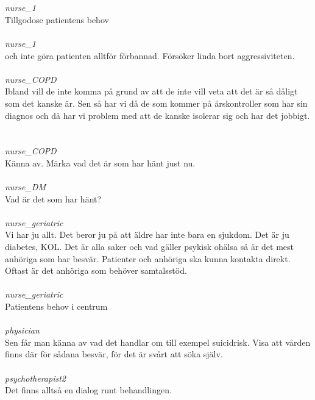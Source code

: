 \documentclass[12pt,a4paper,oneside]{article}
\begin{document}
\ \\\ \\
 { \it   nurse\_1 %
}\\
Tillgodose patientens behov %
\ \\\ \\
 { \it   nurse\_1 %
}\\
och inte g{\"o}ra patienten alltf{\"o}r f{\"o}rbannad. F{\"o}rs{\"o}ker linda bort aggressiviteten. %
\ \\\ \\
 { \it   nurse\_COPD %
}\\
Ibland vill de inte komma p{\aa} grund av att de inte vill veta att det {\"a}r s{\aa} d{\aa}ligt som det kanske {\"a}r. Sen s{\aa} har vi d{\aa} de som kommer p{\aa} {\aa}rskontroller som har sin diagnos och d{\aa} har vi problem med att de kanske isolerar sig och har det jobbigt. %
\ \\\ \\
 { \it   nurse\_COPD %
}\\
K{\"a}nna av. M{\"a}rka vad det {\"a}r som har h{\"a}nt just nu. %
\ \\\ \\
 { \it   nurse\_DM %
}\\
Vad {\"a}r det som har h{\"a}nt? %
\ \\\ \\
 { \it   nurse\_geriatric %
}\\
Vi har ju allt. Det beror ju p{\aa} att {\"a}ldre har inte bara en sjukdom. Det {\"a}r ju diabetes, KOL. Det {\"a}r alla saker och vad g{\"a}ller psykisk oh{\"a}lsa s{\aa} {\"a}r det mest anh{\"o}riga som har besv{\"a}r. Patienter och anh{\"o}riga ska kunna kontakta direkt. Oftast {\"a}r det anh{\"o}riga som beh{\"o}ver samtalsst{\"o}d.  %
\ \\\ \\
 { \it   nurse\_geriatric %
}\\
Patientens behov i centrum %
\ \\\ \\
 { \it   physician %
}\\
Sen f{\aa}r man k{\"a}nna av vad det handlar om till exempel suicidrisk. Visa att v{\aa}rden finns d{\"a}r f{\"o}r s{\aa}dana besv{\"a}r, f{\"o}r det {\"a}r sv{\aa}rt att s{\"o}ka sj{\"a}lv. %
\ \\\ \\
 { \it   psychotherapist2 %
}\\
Det finns allts{\aa} en dialog runt behandlingen. %
\end{document}
